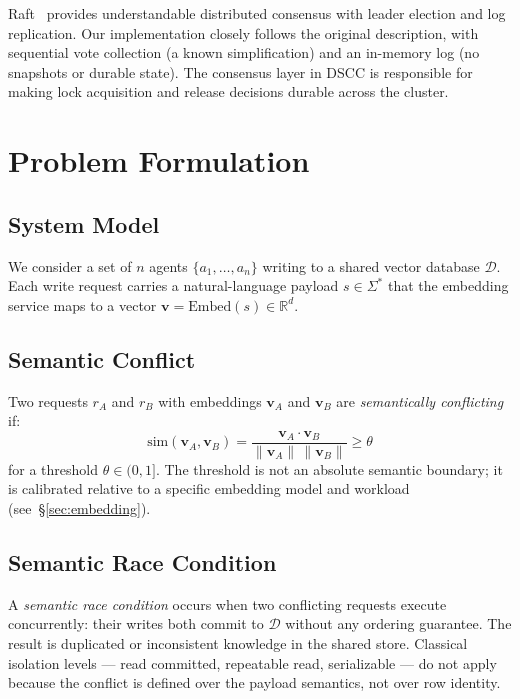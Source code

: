 \documentclass[sigconf]{acmart}
\begin{document}
Raft~\cite{raft} provides understandable distributed consensus with leader election and
log replication. Our implementation closely follows the original description, with
sequential vote collection (a known simplification) and an in-memory log (no snapshots or
durable state). The consensus layer in DSCC is responsible for making lock acquisition and
release decisions durable across the cluster.

\section{Problem Formulation}
\label{sec:problem}

\subsection{System Model}

We consider a set of $n$ agents $\{a_1, \ldots, a_n\}$ writing to a shared vector
database $\mathcal{D}$. Each write request carries a natural-language payload
$s \in \Sigma^*$ that the embedding service maps to a vector
$\mathbf{v} = \text{Embed}(s) \in \mathbb{R}^d$.

\subsection{Semantic Conflict}

Two requests $r_A$ and $r_B$ with embeddings $\mathbf{v}_A$ and $\mathbf{v}_B$ are
\emph{semantically conflicting} if:
\begin{equation}
  \text{sim}(\mathbf{v}_A, \mathbf{v}_B) =
  \frac{\mathbf{v}_A \cdot \mathbf{v}_B}{\|\mathbf{v}_A\|\,\|\mathbf{v}_B\|} \geq \theta
  \label{eq:conflict}
\end{equation}
for a threshold $\theta \in (0, 1]$. The threshold is not an absolute semantic boundary;
it is calibrated relative to a specific embedding model and workload
(see~\S\ref{sec:embedding}).

\subsection{Semantic Race Condition}

A \emph{semantic race condition} occurs when two conflicting requests execute
concurrently: their writes both commit to $\mathcal{D}$ without any ordering guarantee.
The result is duplicated or inconsistent knowledge in the shared store. Classical
isolation levels — read committed, repeatable read, serializable — do not apply because
the conflict is defined over the payload semantics, not over row identity.
\end{document}
